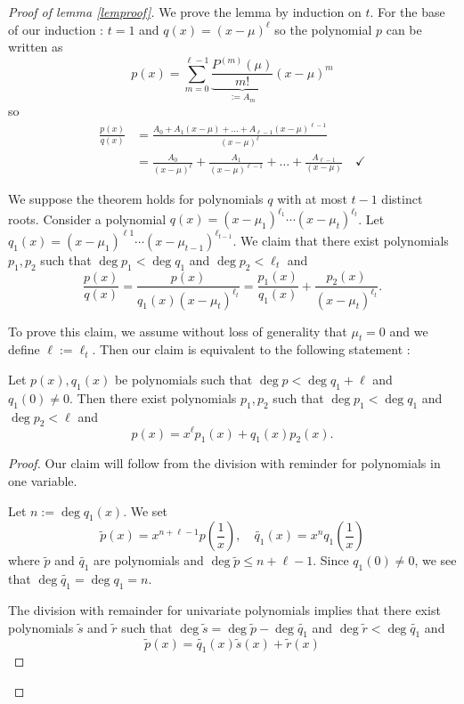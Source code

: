 \begin{proof}[Proof of lemma \ref{lemproof}]
We prove the lemma by induction on $t$. For the base of our induction : $t=1$ and $q(x)=(x-\mu)^{\ell}$ so the polynomial $p$ can be written as
$$
p(x)=\sum_{m=0}^{\ell -1}  \underbrace{ \frac{P^{(m)}(\mu)}{m!} }_{ := A_{m} } (x-\mu)^{m}
$$
so
\begin{align*}
\frac{p(x)}{q(x)} & =\frac{A_{0}+A_{1}(x-\mu)+\dots +A_{\ell -1}(x-\mu)^{\ell -1}}{(x-\mu)^{\ell}} \\
 & =\frac{A_{0}}{(x-\mu)^{\ell}}+\frac{A_{1}}{(x-\mu)^{\ell -1}}+\dots+\frac{A_{\ell -1}}{(x-\mu)}\quad \checkmark
\end{align*}

We suppose the theorem holds for polynomials $q$ with at most $t-1$ distinct roots. Consider a polynomial $q(x)=(x-\mu_{1})^{\ell_{1}}\cdots(x-\mu _{t})^{\ell _{t}}$. Let $q_{1}(x)=(x-\mu_{1})^{\ell 1}\cdots(x-\mu _{t-1})^{\ell _{t-1}}$. We claim that there exist polynomials $p_{1},p_{2}$ such that $\deg p_{1} < \deg q_{1}$ and $\deg p_{2} < \ell _{t}$ and
$$
\frac{p(x)}{q(x)}=\frac{p(x)}{q_{1}(x)(x-\mu _{t})^{\ell _{t}}}=\frac{p_{1}(x)}{q_{1}(x)}+\frac{p_{2}(x)}{(x-\mu _{t})^{\ell _{t}}}.
$$

To prove this claim, we assume without loss of generality that $\mu _{t}=0$ and we define $\ell :=\ell _{t}$. Then our claim is equivalent to the following statement : 
\begin{claim}
Let $p(x),q_{1}(x)$ be polynomials such that $\deg p<\deg q_{1}+\ell$ and $q_{1}(0)\neq 0$. Then there exist polynomials $p_{1},p_{2}$ such that $\deg p_{1} < \deg q_{1}$ and $\deg p_{2}< \ell$ and 
$$
p(x)=x^{\ell}p_{1}(x)+q_{1}(x)p_{2}(x).
$$
\end{claim}
\begin{proof}
Our claim will follow from the division with reminder for polynomials in one variable.

Let $n:=\deg q_{1}(x)$. We set 
$$
\tilde{p}(x)=x^{n+\ell -1}p\left( \frac{1}{x} \right),\quad \tilde{q_{1}}(x)=x^{n}q_{1}\left( \frac{1}{x} \right)
$$
where $\tilde{p}$ and $\tilde{q_{1}}$ are polynomials and $\deg \tilde{p} \le n+\ell -1$. Since $q_{1}(0)\neq 0$, we see that $\deg \tilde{q_{1}}=\deg q_{1}=n$. 

The division with remainder for univariate polynomials implies that there exist polynomials $\tilde{s}$ and $\tilde{r}$ such that $\deg \tilde{s}=\deg \tilde{p} - \deg \tilde{q_{1}}$ and $\deg \tilde{r}<\deg \tilde{ q_{1}}$ and
$$
\tilde{p}(x)=\tilde{q_{1}}(x)\tilde{s}(x)+\tilde{r}(x)
$$


\end{proof}
\end{proof}
